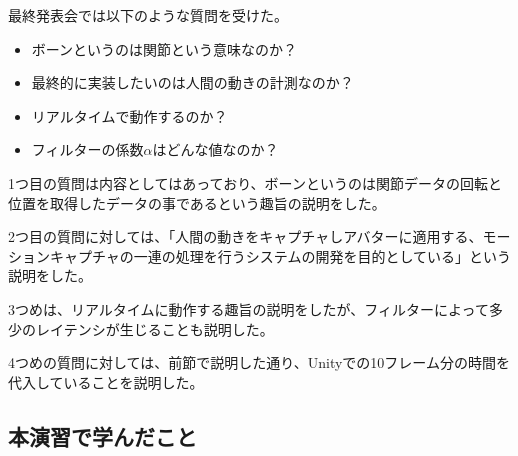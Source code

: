\documentclass[a4j]{jsarticle}
\begin{document}
最終発表会では以下のような質問を受けた。

\begin{itemize}
  \item ボーンというのは関節という意味なのか？
  \item 最終的に実装したいのは人間の動きの計測なのか？
  \item リアルタイムで動作するのか？
  \item フィルターの係数$\alpha$はどんな値なのか？
\end{itemize}

1つ目の質問は内容としてはあっており、ボーンというのは関節データの回転と位置を取得したデータの事であるという趣旨の説明をした。

2つ目の質問に対しては、「人間の動きをキャプチャしアバターに適用する、モーションキャプチャの一連の処理を行うシステムの開発を目的としている」という説明をした。

3つめは、リアルタイムに動作する趣旨の説明をしたが、フィルターによって多少のレイテンシが生じることも説明した。

4つめの質問に対しては、前節で説明した通り、Unityでの10フレーム分の時間を代入していることを説明した。

\subsection{本演習で学んだこと}
\end{document}
